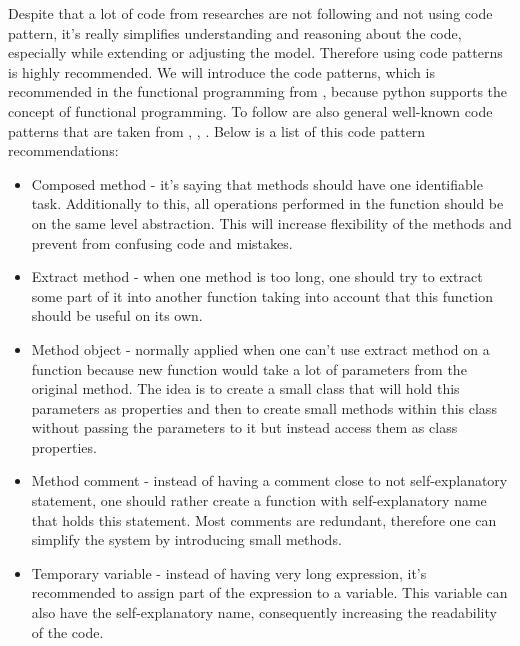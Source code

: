 Despite that a lot of code from researches are not following and not using code
pattern, it's really simplifies understanding and reasoning about the code, especially
while extending or adjusting the model. Therefore using code patterns
is highly recommended. We will introduce the code patterns, which
is recommended in the functional programming from \cite{beck1997smalltalk},
because python supports the concept of functional programming.
To follow are also general well-known code patterns that are taken from
\cite{martin2003agile}, \cite{Eckel2017}, \cite{Gamma:1995:DPE:186897}.
Below is a list of this code pattern recommendations:

\begin{itemize}
	\item Composed method - it's saying that methods should
		have one identifiable task. Additionally to this, all operations
		performed in the function should be on the same level abstraction.
		This will increase flexibility of the methods and prevent
		from confusing code and mistakes. \cite{beck1997smalltalk}
	\item Extract method - when one method is too long, one should try to
		extract some part of it into another function taking into account that this
		function should be useful on its own. \cite{1999:RID:311424}
	\item Method object -  normally applied when one can't use extract method
	 	on a function because new function would take a lot of parameters
		from the original method.
		The idea is to create a small class that will hold this parameters
		as properties and then to create small methods within this class without
		passing the parameters to it but instead access them as class properties.
		\cite{beck1997smalltalk}
	\item Method comment - instead of having a comment close to not
		self-explanatory statement, one should rather create a function
		with self-explanatory name that holds this statement.
		Most comments are redundant, therefore one can simplify
		the system by introducing small methods.
		\cite{beck1997smalltalk}
	\item Temporary variable - instead of having very long expression, it's recommended
		to assign part of the expression to a variable. This variable can also have
		the self-explanatory name, consequently increasing the readability of the code.\cite{beck1997smalltalk}


\end{itemize}
